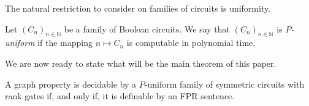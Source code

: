 \documentclass[../paper.tex]{subfiles}
\begin{document}
The natural restriction to consider on families of circuits is uniformity.

\begin{definition}
  Let $(C_n)_{n \in \mathbb{N}}$ be a family of Boolean circuits. We say that
  $(C_n)_{n \in \mathbb{N}}$ is \emph{$P$-uniform} if the mapping $n \mapsto C_n$ is
  computable in polynomial time.
\end{definition}

We are now ready to state what will be the main theorem of this paper.

\begin{thm}
 A graph property is decidable by a $P$-uniform family of symmetric circuits
 with rank gates if, and only if, it is definable by an FPR sentence.
\end{thm}


\end{document}
